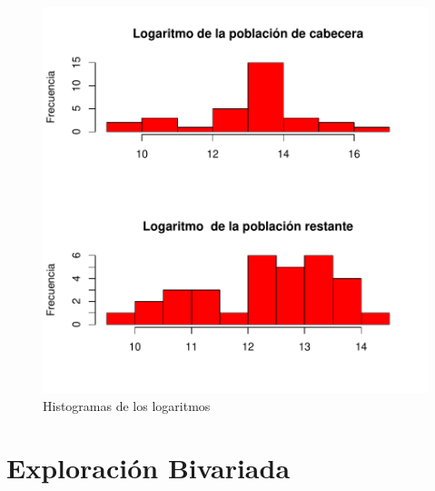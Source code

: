 \documentclass{article}
\begin{document}
\begin{figure}[h]
\centering
\includegraphics{ProyectoFinal-graficosSesgo}
\caption{Histogramas de los logaritmos}
\label{histogramasLog}
\end{figure}

\clearpage

\section{Exploración Bivariada}
\end{document}
